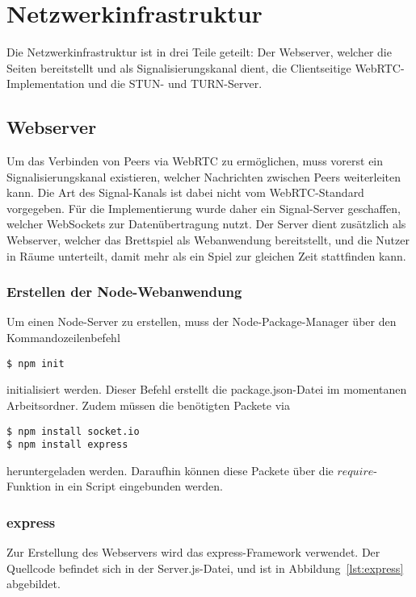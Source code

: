 \section{Netzwerkinfrastruktur}
Die Netzwerkinfrastruktur ist in drei Teile geteilt: Der Webserver, welcher die Seiten bereitstellt und als Signalisierungskanal dient, die Clientseitige WebRTC-Implementation und die \acs{STUN}- und \acs{TURN}-Server.

\subsection{Webserver}
Um das Verbinden von Peers via WebRTC zu ermöglichen, muss vorerst ein Signalisierungskanal existieren, welcher Nachrichten zwischen Peers weiterleiten kann. Die Art des Signal-Kanals ist dabei nicht vom WebRTC-Standard vorgegeben. Für die Implementierung wurde daher ein Signal-Server geschaffen, welcher WebSockets zur Datenübertragung nutzt. Der Server dient zusätzlich als Webserver, welcher das Brettspiel als Webanwendung bereitstellt, und die Nutzer in \glqq{}Räume\grqq{} unterteilt, damit mehr als ein Spiel zur gleichen Zeit stattfinden kann.\par

\subsubsection{Erstellen der Node-Webanwendung}
Um einen Node-Server zu erstellen, muss der Node-Package-Manager über den Kommandozeilenbefehl

\lstset{style=STYLE_COMMAND_LINE_ARGUMENT_SINGLE_LINE}
\begin{lstlisting}[belowskip=-0.8 \baselineskip]
$ npm init
\end{lstlisting}

initialisiert werden. Dieser Befehl erstellt die \glqq{}package.json\grqq{}-Datei im momentanen Arbeitsordner. Zudem müssen die benötigten Packete via

\lstset{style=STYLE_COMMAND_LINE_ARGUMENT_SINGLE_LINE}
\begin{lstlisting}[belowskip=-0.8 \baselineskip]
$ npm install socket.io
$ npm install express
\end{lstlisting}

heruntergeladen werden. Daraufhin können diese Packete über die $require$-Funktion in ein Script eingebunden werden.

\subsubsection{express}
Zur Erstellung des Webservers wird das \glqq{}express\grqq{}-Framework verwendet. Der Quellcode befindet sich in der \glqq{}Server.js\grqq{}-Datei, und ist in Abbildung~\ref{lst:express} abgebildet.

